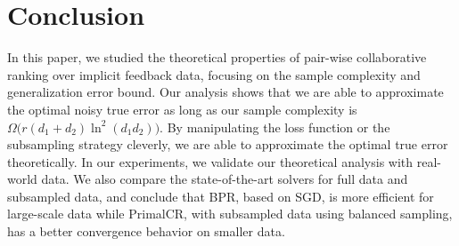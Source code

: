 \documentclass{article}
\numberwithin{equation}{section}
\newtheorem{sampling strategy}{Sampling Strategy}
\begin{document}
\section{Conclusion}
\label{sec:conclusion}

In this paper, we studied the theoretical properties of pair-wise collaborative ranking  over implicit feedback data, focusing on the sample complexity and generalization error bound. Our analysis shows that we are able to approximate the optimal noisy true error as long as our sample complexity is $\Omega \big( r(d_1+d_2)\ln^2(d_1d_2) \big)$. By manipulating the loss function or the subsampling strategy cleverly, we are able to approximate the optimal true error theoretically. 
In our experiments, we validate our theoretical analysis with real-world data. We also compare the state-of-the-art solvers for full data and subsampled data, and conclude that \textsf{BPR}, based on SGD, is more efficient for large-scale data while \textsf{PrimalCR}, with subsampled data using balanced sampling,  has a better convergence behavior on smaller data.  



\newpage




\nocite{hsieh2015pu}
\nocite{crlinear}
\nocite{pcfpr}
\nocite{cr}
\nocite{bpr}
\nocite{cfimplicit}
\nocite{listwise}
\nocite{1bit}
\nocite{uml}
\nocite{maxmargin}
\nocite{Mc}
\nocite{neural}
\nocite{negsample}
\nocite{netflix}
\nocite{yahoo!}
\nocite{listcollaborativefiltering}
\nocite{bprsample}
\nocite{bprsample2}
\nocite{collaborativeranking}
\nocite{korenmf}
\nocite{pmf}
\nocite{sideinformation}
\nocite{bmc}
\nocite{millionsongs}










\end{document}
